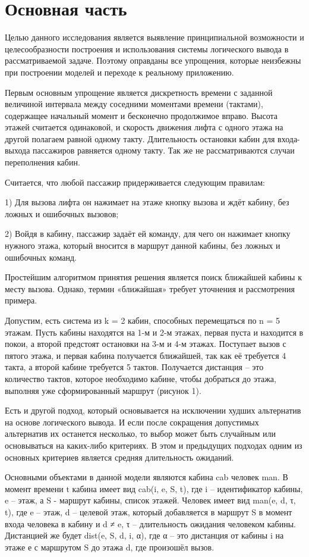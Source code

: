 \section{ Основная часть}

	Целью данного исследования является выявление принципиальной возможности и целесообразности построения и использования системы логического вывода в рассматриваемой задаче. Поэтому оправданы все упрощения, которые неизбежны при построении моделей и переходе к реальному приложению.

Первым основным упрощение является дискретность времени с заданной величиной интервала между соседними моментами времени (тактами), содержащее начальный момент и бесконечно продолжимое вправо. Высота этажей считается одинаковой, и скорость движения лифта с одного этажа на другой полагаем равной одному такту. Длительность остановки кабин для входа-выхода пассажиров равняется одному такту. Так же не рассматриваются случаи переполнения кабин.

Считается, что любой пассажир придерживается следующим правилам:

1) Для вызова лифта он нажимает на этаже кнопку вызова и ждёт кабину, без ложных и ошибочных вызовов;

2) Войдя в кабину, пассажир задаёт ей команду, для чего он нажимает кнопку нужного этажа, который вносится в маршрут данной кабины, без ложных и ошибочных команд.

Простейшим алгоритмом принятия решения является поиск ближайшей кабины к месту вызова. Однако, термин «ближайшая» требует уточнения и рассмотрения примера. 

Допустим, есть система из k = 2 кабин, способных перемещаться по n = 5 этажам. Пусть кабины находятся на 1-м и 2-м этажах, первая пуста и находится в покои, а второй предстоят остановки на 3-м и 4-м этажах. Поступает вызов с пятого этажа, и первая кабина получается ближайшей, так как её требуется 4 такта, а второй кабине требуется 5 тактов. Получается дистанция – это количество тактов, которое необходимо кабине, чтобы добраться до этажа, выполняя уже сформированный маршрут (рисунок 1).

Есть и другой подход, который основывается на исключении худших альтернатив на основе логического вывода. И если после сокращения допустимых альтернатив их останется несколько, то выбор может быть случайным или основываться на каких-либо критериях. В этом и предыдущих подходах одним из основных критериев является средняя длительность ожиданий.

Основными объектами в данной модели являются кабина cab человек man. В момент времени t кабина имеет вид cab(i, e, S, t), где i – идентификатор кабины, e – этаж, а S - маршрут кабины, список этажей. Человек имеет вид man(e, d, τ, t), где e – этаж, d – целевой этаж, который добавляется в маршрут S в момент входа человека в кабину и d ≠ e, τ – длительность ожидания человеком кабины. Дистанцией же будет dist(e, S, d, i, α), где α – это дистанция от кабины i на этаже е с маршрутом S до этажа d, где произошёл вызов.
